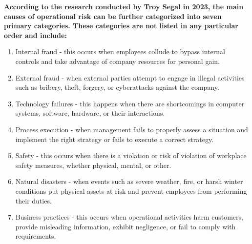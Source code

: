 \textbf{According to the research conducted by Troy Segal in 2023, the main causes of operational risk can be further categorized into seven primary categories. These categories are not listed in any particular order and include:}

\begin{enumerate}
    \item Internal fraud - this occurs when employees collude to bypass internal controls and take advantage of 
    company resources for personal gain.

    \item External fraud - when external parties attempt to engage in illegal activities such as bribery, theft, 
    forgery, or cyberattacks against the company.

    \item Technology failures - this happens when there are shortcomings in computer systems, software, hardware, 
    or their interactions.

    \item Process execution - when management fails to properly assess a situation and implement the right strategy 
    or fails to execute a correct strategy.

    \item Safety - this occurs when there is a violation or risk of violation of workplace safety measures, whether 
    physical, mental, or other.

    \item Natural disasters - when events such as severe weather, fire, or harsh winter conditions put physical 
    assets at risk and prevent employees from performing their duties.

    \item Business practices - this occurs when operational activities harm customers, provide misleading 
    information, exhibit negligence, or fail to comply with requirements.
\end{enumerate}


